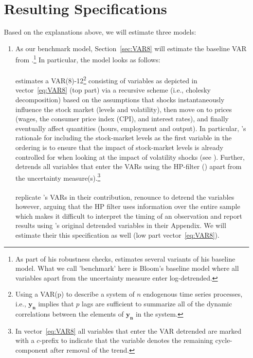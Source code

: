 \documentclass[a4paper,11pt,listof=nochaptergap,oneside,pointednumbers,bibtotoc,bigheadings,liststotoc]{scrbook}
\theoremstyle{mysatz}
\theoremstyle{mydefinition}
\theoremstyle{mybemerkung}
\newcommand{\vect}[1]{\boldsymbol{\mathbf{#1}}}
\begin{document}
\section{Resulting Specifications}
Based on the explanations above, we will estimate three models:
\begin{enumerate}

\item As our benchmark model, Section~\ref{sec:VAR8} will estimate the baseline VAR from \citet{bloom:09}.\footnote{As part of his robustness checks, \citet{bloom:09} estimates several variants of his baseline model. What we call 'benchmark' here is Bloom's baseline model where all variables apart from the uncertainty measure enter log-detrended.} In particular, the model looks as follows:\\
\\
\citet{bloom:09} estimates a VAR(8)-12\footnote{Using a VAR(p) to describe a system of $n$ endogenous time series processes, i.e., $\vect{y_n}$ implies that $p$ lags are sufficient to summarize all of the dynamic correlations between the elements of $\vect{y_n}$ in the system.} consisting of variables as depicted in vector~\ref{eq:VAR8} (top part) via a recursive scheme (i.e., cholesky decomposition) based on the assumptions that shocks instantaneously influence the stock market (levels and volatility), then move on to prices (wages, the consumer price index (CPI), and interest rates), and finally eventually affect quantities (hours, employment and output). In particular, \citet{bloom:09}'s rationale for including the stock-market levels as the first variable in the ordering is to ensure that the impact of stock-market levels is already controlled for when looking at the impact of volatility shocks (see \citealp[p. 630]{bloom:09}). Further, \citet{bloom:09} detrends all variables that enter the VARs using the HP-filter (\citealp{hodrickandprescott:97}) apart from the uncertainty measure(s).\footnote{In vector~\ref{eq:VAR8} all variables that enter the VAR detrended are marked with a $c$-prefix to indicate that the variable denotes the remaining cycle-component after removal of the trend.}\\
\\
\citet{juradoetal:15} replicate \citet{bloom:09}'s VARs in their contribution, renounce to detrend the variables however, arguing that the HP filter uses information over the entire sample which makes it difficult to interpret the timing of an observation and report results using \citet{bloom:09}'s original detrended variables in their Appendix. We will estimate their this specification as well (low part vector~\ref{eq:VAR8}).


\end{enumerate}
\end{document}
